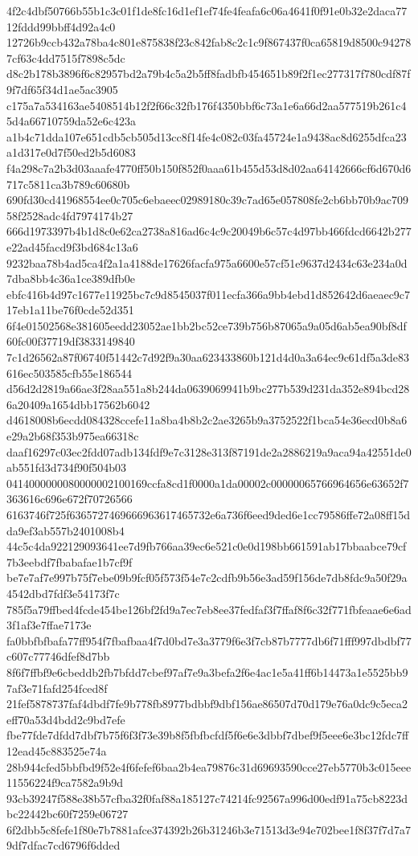 {4f2c4dbf50766b55b1c3c01f1de8fc16d1ef1ef74fe4feafa6c06a4641f0f91e0b32e2daca7712fddd99bbff4d92a4c0
12726b9ccb432a78ba4c801e875838f23c842fab8c2c1c9f867437f0ca65819d8500c942787cf63c4dd7515f7898c5dc
d8c2b178b3896f6c82957bd2a79b4c5a2b5ff8fadbfb454651b89f2f1ec277317f780cdf87f9f7df65f34d1ae5ac3905
c175a7a534163ae5408514b12f2f66c32fb176f4350bbf6c73a1e6a66d2aa577519b261c45d4a66710759da52e6c423a
a1b4c71dda107e651cdb5cb505d13cc8f14fe4c082c03fa45724e1a9438ac8d6255dfca23a1d317e0d7f50ed2b5d6083
f4a298c7a2b3d03aaafe4770ff50b150f852f0aaa61b455d53d8d02aa64142666cf6d670d6717c5811ca3b789c60680b
690fd30cd41968554ee0c705c6ebaeec02989180c39c7ad65e057808fe2cb6bb70b9ac70958f2528adc4fd7974174b27
666d1973397b4b1d8c0e62ca2738a816ad6c4c9c20049b6c57c4d97bb466fdcd6642b277e22ad45facd9f3bd684c13a6
9232baa78b4ad5ca4f2a1a4188de17626facfa975a6600e57cf51e9637d2434c63e234a0d7dba8bb4c36a1ce389dfb0e
ebfc416b4d97c1677e11925bc7c9d8545037f011ecfa366a9bb4ebd1d852642d6aeaec9c717eb1a11be76f0cde52d351
6f4e01502568e381605eedd23052ae1bb2bc52ce739b756b87065a9a05d6ab5ea90bf8df60fc00f37719df3833149840
7c1d26562a87f06740f51442c7d92f9a30aa623433860b121d4d0a3a64ec9c61df5a3de83616ec503585cfb55e186544
d56d2d2819a66ae3f28aa551a8b244da0639069941b9bc277b539d231da352e894bcd286a20409a1654dbb17562b6042
d4618008b6ecdd084328ccefe11a8ba4b8b2c2ae3265b9a3752522f1bca54e36ecd0b8a6e29a2b68f353b975ea66318c
daaf16297c03ec2fdd07adb134fdf9e7c3128e313f87191de2a2886219a9aca94a42551de0ab551fd3d734f90f504b03
0414000000080000002100169ccfa8cd1f0000a1da00002c00000065766964656e63652f7363616c696e672f70726566
6163746f725f6365727469666963617465732e6a736f6eed9ded6e1cc79586ffe72a08ff15dda9ef3ab557b2401008b4
44c5c4da922129093641ee7d9fb766aa39ec6e521c0e0d198bb661591ab17bbaabce79cf7b3eebdf7fbabafae1b7cf9f
be7e7af7e997b75f7ebe09b9fcf05f573f54e7c2cdfb9b56e3ad59f156de7db8fdc9a50f29a4542dbd7fdf3e54173f7c
785f5a79ffbed4fcde454be126bf2fd9a7ec7eb8ee37fedfaf3f7ffaf8f6c32f771fbfeaae6e6ad3f1af3e7ffae7173e
fa0bbfbfbafa77ff954f7fbafbaa4f7d0bd7e3a3779f6e3f7cb87b7777db6f71fff997dbdbf77c607c77746dfef8d7bb
8f6f7ffbf9e6cbeddb2fb7bfdd7cbef97af7e9a3befa2f6e4ac1e5a41ff6b14473a1e5525bb97af3e71fafd254fced8f
21fef5878737faf4dbdf7fe9b778fb8977bdbbf9dbf156ae86507d70d179e76a0dc9c5eca2eff70a53d4bdd2c9bd7efe
fbe77fde7dfdd7dbf7b75f6f3f73e39b8f5fbfbcfdf5f6e6e3dbbf7dbef9f5eee6e3bc12fdc7ff12ead45c883525e74a
28b944cfed5bbfbd9f52e4f6fefef6baa2b4ea79876c31d69693590cce27eb5770b3c015eee11556224f9ca7582a9b9d
93cb39247f588e38b57cfba32f0faf88a185127c74214fc92567a996d00edf91a75cb8223dbc22442bc60f7259e06727
6f2dbb5c8fefe1f80e7b7881afce374392b26b31246b3e71513d3e94e702bee1f8f37f7d7a79df7dfac7cd6796f6dded
}

